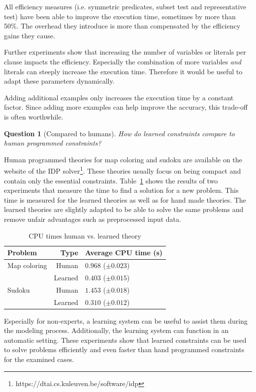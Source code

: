 \documentclass[letterpaper]{article}
\newtheorem{question}{Question}
\theoremstyle{definition}
\begin{document}
All efficiency measures (i.e. symmetric predicates, subset test and representative test) have been able to improve the execution time, sometimes by more than 50\%.
The overhead they introduce is more than compensated by the efficiency gains they cause.

Further experiments show that increasing the number of variables or literals per clause impacts the efficiency.
Especially the combination of more variables \emph{and} literals can steeply increase the execution time.
Therefore it would be useful to adapt these parameters dynamically.

Adding additional examples only increases the execution time by a constant factor.
Since adding more examples can help improve the accuracy, this trade-off is often worthwhile.

\begin{question}[Compared to humans]
  How do learned constraints compare to human programmed constraints?
\end{question}
Human programmed theories for map coloring and sudoku are available on the website of the IDP solver\footnote{https://dtai.cs.kuleuven.be/software/idp}.
These theories usually focus on being compact and contain only the essential constraints.
Table~\ref{tbl:mens} shows the results of two experiments that measure the time to find a solution for a new problem.
This time is measured for the learned theories as well as for hand made theories.
The learned theories are slightly adapted to be able to solve the same problems and remove unfair advantages such as preprocessed input data.

  \begin{table}[!htp]
    \caption{CPU times human vs. learned theory}
    \begin{tabularx}{\linewidth}{lr|X}
      \textbf{Problem} & \textbf{Type} & \textbf{Average CPU time (s)} \\
      \toprule
      Map coloring & Human & $0.968$  ($\pm 0.023$) \\
      & Learned & $0.403$       ($\pm 0.015$) \\
      \midrule
      Sudoku & Human & $1.453$    ($\pm 0.018$) \\ 
      & Learned & $0.310$       ($\pm 0.012$)
    \end{tabularx}
    \label{tbl:mens}
  \end{table}

Especially for non-experts, a learning system can be useful to assist them during the modeling process.
Additionally, the learning system can function in an automatic setting.
These experiments show that learned constraints can be used to solve problems efficiently and even faster than hand programmed constraints for the examined cases.
\end{document}
